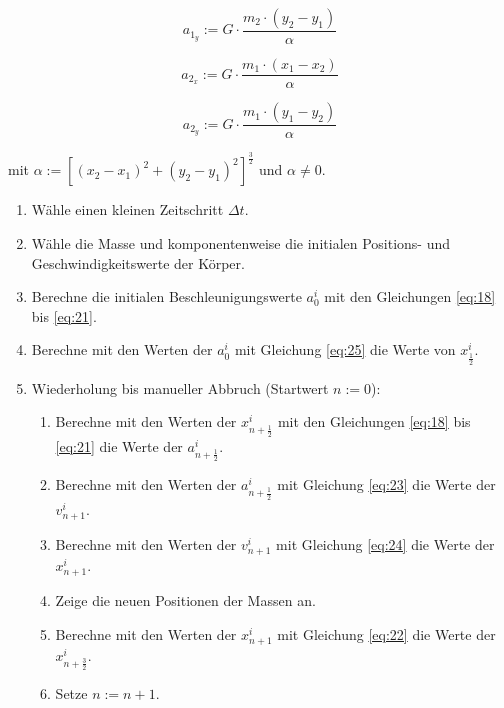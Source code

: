 \documentclass[10pt,twocolumn]{scrartcl}
\begin{document}
\begin{equation}a_{1_y} := G \cdot \frac{m_2 \cdot (y_2 - y_1)}
			{\alpha}
\label{eq:19}
\end{equation}

\begin{equation}a_{2_x} := G \cdot \frac{m_1 \cdot (x_1 - x_2)}
			{\alpha}
\label{eq:20}
\end{equation}

\begin{equation}a_{2_y} := G \cdot \frac{m_1 \cdot (y_1 - y_2)}
			{\alpha}
\label{eq:21}
\end{equation}

mit $\alpha := [(x_2-x_1)^2 + (y_2-y_1)^2]^\frac{3}{2}$ und $\alpha \neq 0$.

\begin{enumerate}
	\item Wähle einen kleinen Zeitschritt $\Delta t$.
	\item Wähle die Masse und komponentenweise die initialen Positions- und Geschwindigkeitswerte der Körper.
	\item Berechne die initialen Beschleunigungswerte $a_0^i$ mit den Gleichungen \eqref{eq:18} bis \eqref{eq:21}.
	\item Berechne mit den Werten der $a_0^i$ mit Gleichung \eqref{eq:25} die Werte von $x_{\frac{1}{2}}^i$.
	\item Wiederholung bis manueller Abbruch (Startwert $n:=0$):
	\begin{enumerate}
		\item Berechne mit den Werten der $x_{n+\frac{1}{2}}^i$ mit den Gleichungen \eqref{eq:18} bis \eqref{eq:21} die Werte der $a_{n+\frac{1}{2}}^i$.
		\item Berechne mit den Werten der $a_{n+\frac{1}{2}}^i$ mit Gleichung \eqref{eq:23} die Werte der $v_{n+1}^i$.
		\item Berechne mit den Werten der $v_{n+1}^i$ mit Gleichung \eqref{eq:24} die Werte der $x_{n+1}^i$.
		\item Zeige die neuen Positionen der Massen an.
		\item Berechne mit den Werten der $x_{n+1}^i$ mit Gleichung \eqref{eq:22} die Werte der $x_{n+\frac{3}{2}}^i$.
		\item Setze $n := n+1$.
	\end{enumerate}
\end{enumerate}
\end{document}
